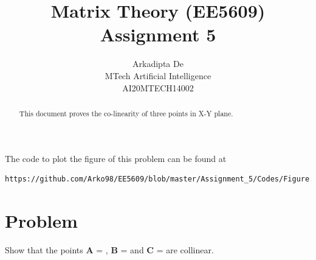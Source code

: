 \documentclass[journal,12pt,twocolumn]{IEEEtran}
\begin{document}
\makeatother
\let\StandardTheFigure\thefigure
\let\vec\mathbf
\renewcommand{\thefigure}{\theproblem}
\def\putbox#1#2#3{\makebox[0in][l]{\makebox[#1][l]{}\raisebox{\baselineskip}[0in][0in]{\raisebox{#2}[0in][0in]{#3}}}}
     \def\rightbox#1{\makebox[0in][r]{#1}}
     \def\centbox#1{\makebox[0in]{#1}}
     \def\topbox#1{\raisebox{-\baselineskip}[0in][0in]{#1}}
     \def\midbox#1{\raisebox{-0.5\baselineskip}[0in][0in]{#1}}
\vspace{3cm}
\title{Matrix Theory (EE5609) Assignment 5}
\author{Arkadipta De\\MTech Artificial Intelligence\\AI20MTECH14002}
\maketitle
\newpage
\bigskip
\renewcommand{\thefigure}{\theenumi}
\renewcommand{\thetable}{\theenumi}
\begin{abstract}
This document proves the co-linearity of three points in X-Y plane.
\end{abstract}
The code to plot the figure of this problem can be found at
%
\begin{lstlisting}
https://github.com/Arko98/EE5609/blob/master/Assignment_5/Codes/Figure.py
\end{lstlisting}
%
\section{Problem}
Show that the points  $\vec{A}$ = , $\vec{B}$ =  and $\vec{C}$ =  are collinear.
\end{document}
